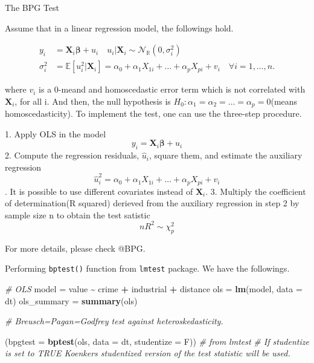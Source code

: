 \documentclass[
  12pt,
]{article}
\newenvironment{Shaded}{\begin{snugshade}}{\end{snugshade}}
\newcommand{\CommentTok}[1]{\textcolor[rgb]{0.56,0.35,0.01}{\textit{#1}}}
\newcommand{\DataTypeTok}[1]{\textcolor[rgb]{0.13,0.29,0.53}{#1}}
\newcommand{\KeywordTok}[1]{\textcolor[rgb]{0.13,0.29,0.53}{\textbf{#1}}}
\newcommand{\NormalTok}[1]{#1}
\newcommand{\OperatorTok}[1]{\textcolor[rgb]{0.81,0.36,0.00}{\textbf{#1}}}
\newcommand{\StringTok}[1]{\textcolor[rgb]{0.31,0.60,0.02}{#1}}
\begin{document}
\begin{itembox}[1]{The BPG Test}

Assume that in a linear regression model, the followings hold.

\begin{align*}
        y_i & = \mathbf{X}_i \mathbf{\beta} + u_i \quad u_i|\mathbf{X}_i \sim \mathcal{N}_{\mathbb{R}}(0, \sigma^2_i) \\
        \sigma^2_i & = \mathbb{E}[u_i^2|\mathbf{X}_i] = \alpha_0 + \alpha_1 X_{1i} + \dots + \alpha_{p} X_{pi}  + v_i \quad \forall i = 1, \dots, n.
\end{align*}

where $v_i$ is a 0-meand and homoscedastic error term which is not correlated with $\mathbf{X}_i$, for all i.
And then, the null hypothesis is $H_0 : \alpha_1 = \alpha_2 = \dots = \alpha_p = 0$(means homoscedasticity). To implement the test, one can use the three-step procedure.

1. Apply OLS in the model $$y_i  = \mathbf{X}_i \mathbf{\beta} + u_i$$
2. Compute the regression residuals, $\hat{u}_i$, square them, and estimate the auxiliary regression $$\hat{u}_i^2 = \alpha_0 + \alpha_1 X_{1i} + \dots + \alpha_{p} X_{pi}  + v_i$$. It is possible to use different covariates instead of $\mathbf{X}_i$.
3. Multiply the coefficient of determination(R squared) derieved from the auxiliary regression in step 2 by sample size n to obtain the test satistic $$n R^2 \sim \chi^2_{p}$$

For more details, please check @BPG.

\end{itembox}

Performing \texttt{bptest()} function from \texttt{lmtest} package. We have the followings.

\begin{Shaded}
\begin{Highlighting}[]
\CommentTok{\# OLS}
\NormalTok{model =}\StringTok{ }\NormalTok{value }\OperatorTok{\textasciitilde{}}\StringTok{ }\NormalTok{crime }\OperatorTok{+}\StringTok{ }\NormalTok{industrial }\OperatorTok{+}\StringTok{ }\NormalTok{distance}
\NormalTok{ols =}\StringTok{ }\KeywordTok{lm}\NormalTok{(model, }\DataTypeTok{data =}\NormalTok{ dt)}
\NormalTok{ols\_summary =}\StringTok{ }\KeywordTok{summary}\NormalTok{(ols)}

\CommentTok{\# Breusch=Pagan=Godfrey test against heteroskedasticity.}

\NormalTok{(}\DataTypeTok{bpgtest =} \KeywordTok{bptest}\NormalTok{(ols, }\DataTypeTok{data =}\NormalTok{ dt, }\DataTypeTok{studentize =}\NormalTok{ F)) }\CommentTok{\# from lmtest}
\CommentTok{\# If studentize is set to TRUE Koenker\textquotesingle{}s studentized version of the test statistic will be used.}
\end{Highlighting}
\end{Shaded}
\end{document}
